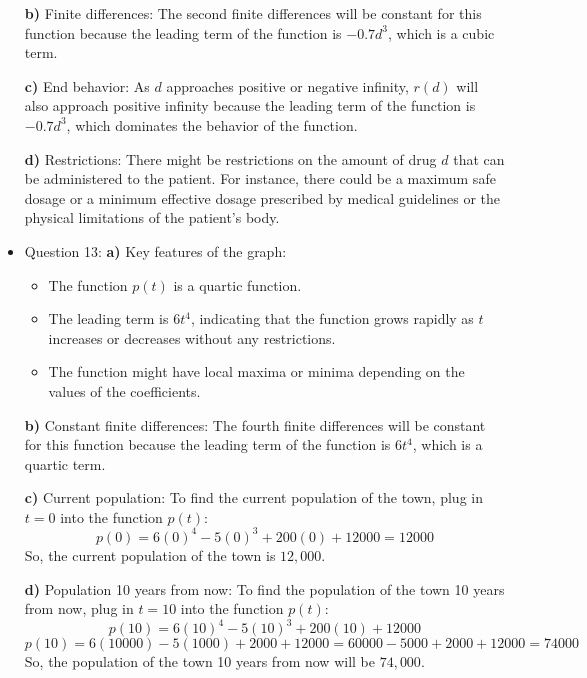 \documentclass{article}
\begin{document}
\begin{itemize}
\textbf{b)} Finite differences: The second finite differences will be constant for this function because the leading term of the function is $-0.7d^3$, which is a cubic term.

\textbf{c)} End behavior: As $d$ approaches positive or negative infinity, $r(d)$ will also approach positive infinity because the leading term of the function is $-0.7d^3$, which dominates the behavior of the function.

\textbf{d)} Restrictions: There might be restrictions on the amount of drug $d$ that can be administered to the patient. For instance, there could be a maximum safe dosage or a minimum effective dosage prescribed by medical guidelines or the physical limitations of the patient's body.
    \item Question 13: 
    \textbf{a)} Key features of the graph:
\begin{itemize}
    \item The function $p(t)$ is a quartic function.
    \item The leading term is $6t^4$, indicating that the function grows rapidly as $t$ increases or decreases without any restrictions.
    \item The function might have local maxima or minima depending on the values of the coefficients.
\end{itemize}

\textbf{b)} Constant finite differences: The fourth finite differences will be constant for this function because the leading term of the function is $6t^4$, which is a quartic term.

\textbf{c)} Current population: To find the current population of the town, plug in $t = 0$ into the function $p(t)$:
\[ p(0) = 6(0)^4 - 5(0)^3 + 200(0) + 12000 = 12000 \]
So, the current population of the town is $12,000$.

\textbf{d)} Population 10 years from now: To find the population of the town 10 years from now, plug in $t = 10$ into the function $p(t)$:
\[ p(10) = 6(10)^4 - 5(10)^3 + 200(10) + 12000 \]
\[ p(10) = 6(10000) - 5(1000) + 2000 + 12000 = 60000 - 5000 + 2000 + 12000 = 74000 \]
So, the population of the town 10 years from now will be $74,000$.


\end{itemize}
\end{document}
